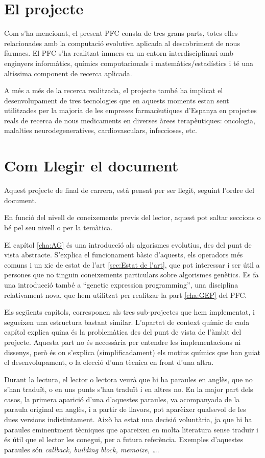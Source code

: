 \section{El projecte}

Com s'ha mencionat, el present PFC consta de tres grans
parts, totes elles relacionades amb la computació evolutiva aplicada al
descobriment de nous fàrmacs. El PFC s'ha realitzat immers en un entorn
interdisciplinari amb enginyers informàtics, químics computacionals i
matemàtics/estadístics i té una altíssima component de recerca aplicada. 

A més a més de la recerca realitzada, el projecte també ha implicat el
desenvolupament de tres tecnologies que en aquests moments estan sent
utilitzades per la majoria de les empreses farmacèutiques d'Espanya en projectes
reals de recerca de nous medicaments en diverses àrees terapèutiques: oncologia,
malalties neurodegeneratives, cardiovasculars, infeccioses, etc.

\section{Com Llegir el document} %
\label{sec:Com Llegir el document}

Aquest projecte de final de carrera, està pensat per ser llegit, seguint l'ordre
del document.

En funció del nivell de coneixements previs del lector, aquest pot saltar
seccions o bé pel seu nivell o per la temàtica.

El capítol \ref{cha:AG} és una introducció als algorismes evolutius, des del
punt de vista abstracte.  S'explica el funcionament bàsic d'aquests, els
operadors més comuns i un xic de estat de l'art \ref{sec:Estat de l'art}, que
pot interessar i ser útil a persones que no tinguin coneixements particulars
sobre algorismes genètics.  Es fa una introducció també a ``genetic expression
programming'', una disciplina relativament nova, que hem utilitzat per realitzar
la part \ref{cha:GEP} del PFC.

Els següents capítols, corresponen als tres sub-projectes que hem implementat, i
segueixen una estructura bastant similar.  L'apartat de context químic de cada
capítol explica quina és la problemàtica des del punt de vista de l'àmbit del
projecte.  Aquesta part no és necessària per entendre les implementacions ni
dissenys, però és on s'explica (simplificadament) els motius químics que han
guiat el desenvolupament, o la elecció d'una tècnica en front d'una altra.

Durant la lectura, el lector o lectora veurà que hi ha paraules en anglès, que
no s'han traduït, o en uns punts s'han traduït i en altres no.  En la major part
dels casos, la primera aparició d'una d'aquestes paraules, va acompanyada de la
paraula original en anglès, i a partir de llavors, pot aparèixer qualsevol de
les dues versions indistintament.  Això ha estat una decisió voluntària, ja que
hi ha paraules eminentment tècniques que apareixen en molta literatura sense
traduir i és útil que el lector les conegui, per a futura referència.  Exemples
d'aquestes paraules són \emph{callback, building block, memoize, \ldots}.

